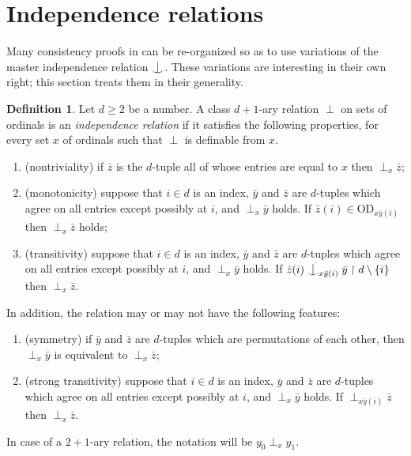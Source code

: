 \documentclass{article}
\newcommand{\vd}{\mathrm{OD}}
\newcommand{\forkindep}[1][]{%
  \mathrel{
    \mathop{
      \vcenter{
        \hbox{\oalign{\noalign{\kern-.3ex}\hfil$\vert$\hfil\cr
              \noalign{\kern-.7ex}
              $\smile$\cr\noalign{\kern-.3ex}}}
      }
    }\displaylimits_{#1}
  }
}
\theoremstyle{definition}
\newtheorem{definition}[theorem]{Definition}
\begin{document}
\section{Independence relations}
\label{independencesection}

Many consistency proofs in \cite{z:geometric, z:vitali, z:triangles, z:distance, z:ngraphs} can be re-organized so as to use variations of the master independence relation $\forkindep$. These variations are interesting in their own right; this section treats them in their generality.

\begin{definition}
Let $d\geq 2$ be a number. A class $d+1$-ary relation $\perp$ on sets of ordinals is an \emph{independence relation} if it satisfies the following properties, for every set $x$ of ordinals such that $\perp$ is definable from $x$.

\begin{enumerate}
\item (nontriviality) if $\bar z$ is the $d$-tuple all of whose entries are equal to $x$ then $\perp_x\bar z$;
\item (monotonicity) suppose that $i\in d$ is an index, $\bar y$ and $\bar z$ are $d$-tuples which agree on all entries except possibly at $i$, and $\perp_x\bar y$ holds. If $\bar z(i)\in\vd_{x\bar y(i)}$ then $\perp_x\bar z$ holds;
\item (transitivity) suppose that $i\in d$ is an index, $\bar y$ and $\bar z$ are $d$-tuples which agree on all entries except possibly at $i$, and $\perp_x\bar y$ holds. If $\bar z(i)\forkindep[x\bar y(i)]\bar y\restriction d\setminus\{i\}$ then $\perp_x\bar z$.
\end{enumerate}

\noindent In addition, the relation may or may not have the following features:

\begin{enumerate}
\item[(4)] (symmetry) if $\bar y$ and $\bar z$ are $d$-tuples which are permutations of each other, then $\perp_x\bar y$ is equivalent to $\perp_x\bar z$;
\item[(5)] (strong transitivity) suppose that $i\in d$ is an index, $\bar y$ and $\bar z$ are $d$-tuples which agree on all entries except possibly at $i$, and $\perp_x\bar y$ holds. If $\perp_{x\bar y(i)}\bar z$ then $\perp_x\bar z$.
\end{enumerate}

\noindent In case of a $2+1$-ary relation, the notation will be $y_0\perp_xy_1$.
\end{definition}
\end{document}
